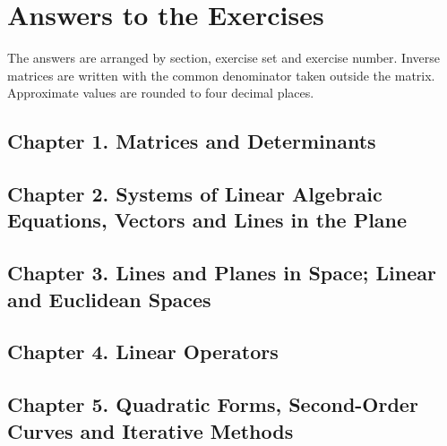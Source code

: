\chapter*{Answers to the Exercises}

\small
The answers are arranged by section, exercise set and exercise number.
Inverse matrices are written with the common denominator taken outside
the matrix. Approximate values are rounded to four decimal places.

\section*{Chapter 1. Matrices and Determinants}






\section*{Chapter 2. Systems of Linear Algebraic Equations, Vectors and Lines in the Plane}






\section*{Chapter 3. Lines and Planes in Space; Linear and Euclidean Spaces}





\section*{Chapter 4. Linear Operators}



\section*{Chapter 5. Quadratic Forms, Second-Order Curves and Iterative Methods}




\normalsize
